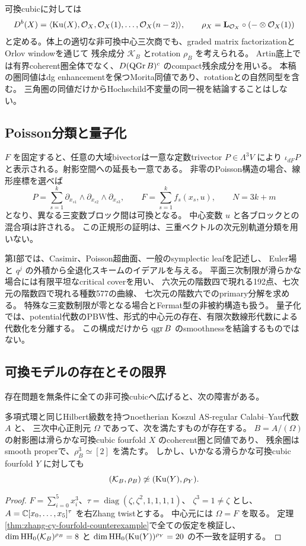 可換cubicに対しては
\[
 D^b(X)=\langle\operatorname{Ku}(X),\mathcal O_X,\mathcal O_X(1),\ldots,\mathcal O_X(n-2)\rangle,
 \qquad
 \rho_X=\mathbf L_{\mathcal O_X}\circ(-\otimes\mathcal O_X(1))
\]
と定める。体上の適切な非可換中心三次商でも、graded matrix factorizationとOrlov windowを通じて
残余成分 \(\mathcal K_B\) とrotation \(\rho_B\) を考えられる。
Artin底上では有界coherent圏全体でなく、\(D(\operatorname{QGr} B)^c\) のcompact残余成分を用いる。
本稿の圏同値はdg enhancementを保つMorita同値であり、rotationとの自然同型を含む。
三角圏の同値だけからHochschild不変量の同一視を結論することはしない。

\subsection{Poisson分類と量子化}

\(F\) を固定すると、任意の大域bivectorは一意な定数trivector \(P\in\Lambda^3V\) により
\(\iota_{dF}P\) と表示される。射影空間への延長も一意である。
非零のPoisson構造の場合、線形座標を選べば
\[
 P=\sum_{s=1}^k\partial_{x_{s1}}\wedge\partial_{x_{s2}}\wedge\partial_{x_{s3}},
 \qquad F=\sum_{s=1}^k f_s(x_s,u),\qquad N=3k+m
\]
となり、異なる三変数ブロック間は可換となる。
中心変数 \(u\) と各ブロックとの混合項は許される。
この正規形の証明は、三重ベクトルの次元別軌道分類を用いない。

第I部では、Casimir、Poisson超曲面、一般のsymplectic leafを記述し、
Euler場と \(q^j\) の外積から全退化スキームのイデアルを与える。
平面三次制限が滑らかな場合には有限平坦なcritical coverを用い、
六次元の階数四で現れる192点、七次元の階数四で現れる種数577の曲線、
七次元の階数六でのprimary分解を求める。
特殊な三変数制限が零となる場合とFermat型の非被約構造も扱う。
量子化では、potential代数のPBW性、形式的中心元の存在、有限次数線形代数による代数化を分離する。
この構成だけから \(\operatorname{qgr} B\) のsmoothnessを結論するものではない。

\subsection{可換モデルの存在とその限界}

存在問題を無条件に全ての非可換cubicへ広げると、次の障害がある。

\begin{theorem}[一般的なrotation付き可換復元の反例]\label{thm:overview-negative}
 多項式環と同じHilbert級数を持つnoetherian Koszul AS-regular Calabi--Yau代数 \(A\) と、
 三次中心正則元 \(\Omega\) であって、次を満たすものが存在する。
 \(B=A/(\Omega)\) の射影圏は滑らかな可換cubic fourfold \(X\) のcoherent圏と同値であり、
 残余圏はsmooth properで、\(\rho_B^3\simeq[2]\) を満たす。
 しかし、いかなる滑らかな可換cubic fourfold \(Y\) に対しても
 \[
 (\mathcal K_B,\rho_B)\not\simeq(\operatorname{Ku}(Y),\rho_Y).
 \]
\end{theorem}
\begin{proof}
 \(F=\sum_{i=0}^5x_i^3\)、\(\tau=\operatorname{diag}(\zeta,\zeta^2,1,1,1,1)\)、
 \(\zeta^3=1\ne\zeta\) とし、\(A=\mathbb C[x_0,\ldots,x_5]^\tau\) を右Zhang twistとする。
 中心元には \(\Omega=F\) を取る。
 定理\ref{thm:zhang-cy-fourfold-counterexample}で全ての仮定を検証し、
 \(\dim\operatorname{HH}_0(\mathcal K_B)^{\rho_B}=8\) と
 \(\dim\operatorname{HH}_0(\operatorname{Ku}(Y))^{\rho_Y}=20\) の不一致を証明する。
\end{proof}

